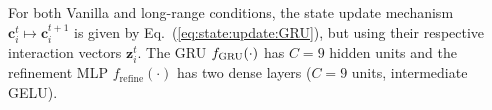 \documentclass[letterpaper]{article}
\newcommand{\bh}[1]{{\color{black}#1}}  %
\begin{document}
\bh{For both Vanilla and long-range conditions, the state update mechanism $\mathbf{c}_i^t\mapsto \mathbf{c}_i^{t+1}$ is given by Eq.~(\ref{eq:state:update:GRU}), but using their respective interaction vectors $\mathbf{z}_i^t$.
The GRU $f_\textnormal{GRU}(\cdot)$ has $C=9$ hidden units and the refinement MLP $f_{\text{refine}}(\cdot)$ has two dense layers ($C=9$ units, intermediate GELU).}
%
%
%
%
%


\end{document}
